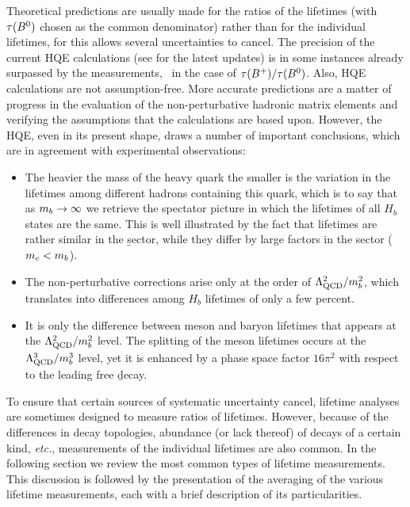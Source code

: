 Theoretical predictions are usually made for the ratios of the lifetimes
(with $\tau(B^0)$ chosen as the common denominator) rather than for the
individual lifetimes, for this allows several uncertainties to cancel.
The precision of the current HQE calculations (see
 for the latest updates)
is in some instances already surpassed by the measurements,
\eg\ in the case of $\tau(B^+)/\tau(B^0)$.  Also, HQE calculations are
not assumption-free.  More accurate predictions are a matter of progress
in the evaluation of the non-perturbative hadronic matrix elements and
verifying the assumptions that the calculations are based upon.
However, the HQE, even in its present shape, draws a number of important
conclusions, which are in agreement with experimental observations:
\begin{itemize}
\item The heavier the mass of the heavy quark the smaller is the
  variation in the lifetimes among different hadrons containing this
  quark, which is to say that as $m_{b}\to\infty$ we retrieve the
  spectator picture in which the lifetimes of all $H_b$ states are the same.
   This is well illustrated by the fact that lifetimes are rather
   similar in the \b sector, while they differ by large factors
   in the  sector ($m_{c}<m_{b}$).
\item The non-perturbative corrections arise only at the order of
  $\Lambda_{\rm QCD}^2/m_{b}^2$, which translates into 
  differences among $H_b$ lifetimes of only a few percent.
\item It is only the difference between meson and baryon lifetimes that
  appears at the $\Lambda_{\rm QCD}^2/m_{b}^2$ level.  The splitting of the
  meson lifetimes occurs at the $\Lambda_{\rm QCD}^3/m_{b}^3$ level, yet it is
  enhanced by a phase space factor $16\pi^2$ with respect to the leading
  free \b decay.
\end{itemize}

To ensure that certain sources of systematic uncertainty cancel, 
lifetime analyses are sometimes designed to measure
ratios of lifetimes.  However, because of the differences in decay
topologies, abundance (or lack thereof) of decays of a certain kind,
{\em etc.}, measurements of the individual lifetimes are also 
common.  In the following section we review the most common
types of lifetime measurements.  This discussion is followed by the
presentation of the averaging of the various lifetime measurements, each
with a brief description of its particularities.


